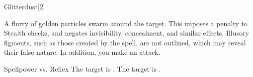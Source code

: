 \begin{spellsection}{Glitterdust}[2]
    \begin{spellheader}
    \end{spellheader}
    \begin{spellcontent}
        \begin{spelltargetinginfo}
        \end{spelltargetinginfo}
        \begin{spelleffects}
            \spelleffect A flurry of golden particles swarm around the target. This imposes a  penalty to Stealth checks, and negates invisibility, concealment, and similar effects. Illusory figments, such as those created by the  spell, are not outlined, which may reveal their false nature. In addition, you make an attack.
            \begin{spellattack}{Spellpower vs. Reflex}
                \spellsuccess The target is \partiallyblinded.
                \spellcritical The target is \blinded.
            \end{spellattack}
            \spelldur \durbrief
        \end{spelleffects}
    \end{spellcontent}
    \begin{spellfooter}
        \miscastyou
    \end{spellfooter}
\end{spellsection}

